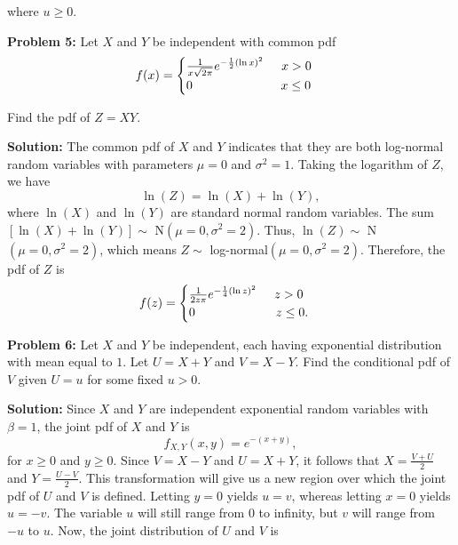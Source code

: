 \documentclass{article}
\newcommand{\mybox}{%
    \collectbox{%
        \setlength{\fboxsep}{1pt}%
        \fbox{\BOXCONTENT}%
    }%
}
\begin{document}
\noindent where $u \geq 0$.  

\pagebreak

\noindent\mybox{\textbf{Problem 5:}}  Let $X$ and $Y$ be independent with common pdf $$f(x) = 
\begin{cases}
\frac{1}{x\sqrt{2\pi}}e^{-\frac{1}{2}(\ln x)^2} \hspace{5mm} x > 0 \\
0 \hspace{25mm} x \leq 0
\end{cases}
$$

\noindent Find the pdf of $Z=XY$.  

\vspace{5mm}

\noindent\mybox{\textbf{Solution:}}  The common pdf of $X$ and $Y$ indicates that they are both log-normal random variables with parameters $\mu = 0$ and $\sigma^2 = 1$.  Taking the logarithm of $Z$, we have
$$\ln(Z) = \ln(X) + \ln(Y),$$ where $\ln(X)$ and $\ln(Y)$ are standard normal random variables.  The sum $[\ln(X) + \ln(Y)] \sim$ N$(\mu = 0, \sigma^2 = 2)$.  Thus, $\ln(Z) \sim$ N$(\mu = 0, \sigma^2 = 2)$, which means $Z \sim$ log-normal$(\mu = 0, \sigma^2 = 2)$.  Therefore, the pdf of $Z$ is 
$$
f(z) = 
\begin{cases}
\frac{1}{2z\pi}e^{-\frac{1}{4}(\ln z)^2} \hspace{5mm} z > 0 \\
0 \hspace{23mm} z \leq 0.
\end{cases}
$$

\pagebreak

\noindent\mybox{\textbf{Problem 6:}}  Let $X$ and $Y$ be independent, each having exponential distribution with mean equal to $1$.  Let $U = X + Y$ and $V = X - Y$.  Find the conditional pdf of $V$ given $U=u$ for some fixed $u > 0$.  

\vspace{5mm}

\noindent\mybox{\textbf{Solution:}}  Since $X$ and $Y$ are independent exponential random variables with $\beta = 1$, the joint pdf of $X$ and $Y$ is
$$ f_{X,Y}(x,y) = e^{-(x+y)}, $$ for $x\geq 0$ and $y \geq 0$.  Since $V = X-Y$ and $U = X + Y$, it follows that $X = \frac{V + U}{2}$ and $Y = \frac{U - V}{2}$.  This transformation will give us a new region over which the joint pdf of $U$ and $V$ is defined.  Letting $y = 0$ yields $u = v$, whereas letting $x = 0$ yields $u = -v$.  The variable $u$ will still range from $0$ to infinity, but $v$ will range from $-u$ to $u$.  Now, the joint distribution of $U$ and $V$ is 
\end{document}
